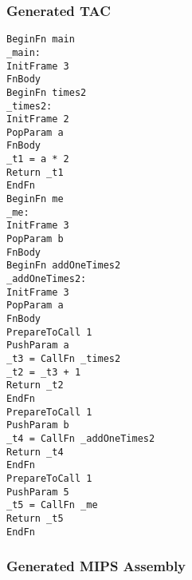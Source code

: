 \subsubsection{Generated TAC}
\begin{lstlisting}[showstringspaces=false,breaklines=true,backgroundcolor=\color{light-gray}, captionpos=b]
BeginFn main
_main:
InitFrame 3
FnBody
BeginFn times2
_times2:
InitFrame 2
PopParam a
FnBody
_t1 = a * 2
Return _t1
EndFn
BeginFn me
_me:
InitFrame 3
PopParam b
FnBody
BeginFn addOneTimes2
_addOneTimes2:
InitFrame 3
PopParam a
FnBody
PrepareToCall 1
PushParam a
_t3 = CallFn _times2
_t2 = _t3 + 1
Return _t2
EndFn
PrepareToCall 1
PushParam b
_t4 = CallFn _addOneTimes2
Return _t4
EndFn
PrepareToCall 1
PushParam 5
_t5 = CallFn _me
Return _t5
EndFn

\end{lstlisting}\subsubsection{Generated MIPS Assembly}
